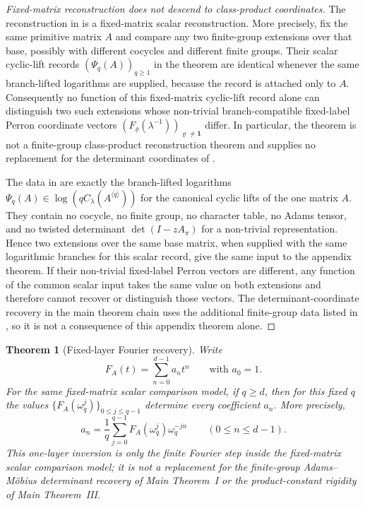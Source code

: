 \documentclass[11pt,a4paper]{amsart}
\theoremstyle{plain}
\newtheorem{theorem}{Theorem}[section]
\theoremstyle{definition}
\theoremstyle{remark}
\begin{document}
\begin{proof}[Fixed-matrix reconstruction does not descend to class-product coordinates]
  The reconstruction in
   is a
  fixed-matrix scalar reconstruction.  More precisely, fix the same primitive
  matrix \(A\) and compare any two finite-group extensions over that base,
  possibly with different cocycles and different finite groups.  Their scalar
  cyclic-lift records \((\Psi_q(A))_{q\ge1}\) in the theorem are identical
  whenever the same branch-lifted logarithms are supplied, because the record
  is attached only to \(A\).  Consequently no function of this fixed-matrix
  cyclic-lift record alone can distinguish two such extensions whose
  non-trivial branch-compatible fixed-label Perron coordinate vectors
  \((F_\varrho(\lambda^{-1}))_{\varrho\ne\mathbf1}\) differ.  In particular,
  the theorem is not a finite-group class-product reconstruction theorem and
  supplies no replacement for the determinant coordinates of
  .

  The data in  are
  exactly the branch-lifted logarithms
  \(\Psi_q(A)\in\log(qC_\lambda(A^{\langle q\rangle}))\) for the canonical
  cyclic lifts of the one matrix \(A\).  They contain no cocycle, no finite
  group, no character table, no Adams tensor, and no twisted determinant
  \(\det(I-zA_\pi)\) for a non-trivial representation.  Hence two extensions
  over the same base matrix, when supplied with the same logarithmic branches
  for this scalar record, give the same input to the appendix theorem.  If
  their non-trivial fixed-label Perron vectors are different, any function of
  the common scalar input takes the same value on both extensions and therefore
  cannot recover or distinguish those vectors.  The determinant-coordinate
  recovery in the main theorem chain uses the additional finite-group data
  listed in , so it is not a
  consequence of this appendix theorem alone.
\end{proof}

\begin{theorem}[Fixed-layer Fourier recovery]
  \label{thm:finite-part-cyclic-lift-single-q-torsion-reconstruction}
  \label{cor:intro-one-layer-reconstruction}
  Write
  \[
    F_A(t)=\sum_{n=0}^{d-1}a_n t^n
    \qquad\text{with } a_0=1.
  \]
  For the same fixed-matrix scalar comparison model, if \(q\ge d\), then
  for this fixed \(q\) the values
  \(\{F_A(\omega_q^j)\}_{0\le j\le q-1}\) determine every coefficient
  \(a_n\). More precisely,
  \[
    a_n=\frac{1}{q}\sum_{j=0}^{q-1}
      F_A(\omega_q^j)\omega_q^{-jn}
    \qquad (0\le n\le d-1).
  \]
  This one-layer inversion is only the finite Fourier step inside the
  fixed-matrix scalar comparison model; it is not a replacement for the
  finite-group Adams--M\"obius determinant recovery of Main Theorem~I or the
  product-constant rigidity of Main Theorem~III.
\end{theorem}
\end{document}
